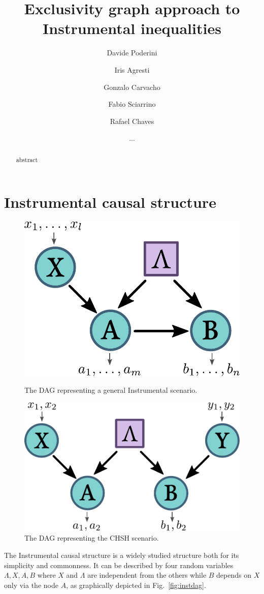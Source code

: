 \documentclass[floatfix, twocolumn, aps, prl]{revtex4-1}
\begin{document}
\title{Exclusivity graph approach to Instrumental inequalities}




\author{Davide Poderini}
\author{Iris Agresti}
\author{Gonzalo Carvacho}
\author{Fabio Sciarrino}

\author{Rafael Chaves}
\author{...}
\begin{abstract}
    abstract
\end{abstract}

\maketitle

\section*{Instrumental causal structure}
\begin{figure}[h]
    \centering
    \parbox{.4\columnwidth}{
        \includegraphics[width=.4\columnwidth]{images/instdag.pdf}
        \caption{The DAG representing a general Instrumental scenario.}
        \label{fig:instdag}
    }
    \qquad
    \parbox{.4\columnwidth}{
        \includegraphics[width=.4\columnwidth]{images/chshdag.pdf}
        \caption{The DAG representing the CHSH scenario.}
        \label{fig:chshdag}
    }
\end{figure}

The Instrumental causal structure is a widely studied
structure both for its simplicity and commonness.
It can be described by four random variables $\Lambda, X, A, B$ where $X$ and
$\Lambda$ are independent from the others while $B$ depends on $X$ only via the node $A$,
as graphically depicted in Fig.~\ref{fig:instdag}.
\end{document}
